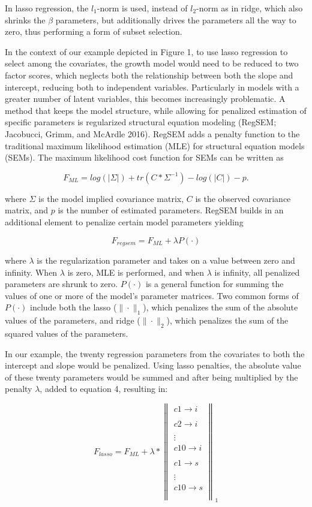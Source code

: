 In lasso regression, the \(l_{1}\)-norm is used, instead of
\(l_{2}\)-norm as in ridge, which also shrinks the \(\beta\) parameters,
but additionally drives the parameters all the way to zero, thus
performing a form of subset selection.

In the context of our example depicted in Figure 1, to use lasso
regression to select among the covariates, the growth model would need
to be reduced to two factor scores, which neglects both the relationship
between both the slope and intercept, reducing both to independent
variables. Particularly in models with a greater number of latent
variables, this becomes increasingly problematic. A method that keeps
the model structure, while allowing for penalized estimation of specific
parameters is regularized structural equation modeling (RegSEM;
Jacobucci, Grimm, and McArdle 2016). RegSEM adds a penalty function to
the traditional maximum likelihood estimation (MLE) for structural
equation models (SEMs). The maximum likelihood cost function for SEMs
can be written as

\[\tag{3}
F_{ML}=log(\left|\Sigma\right|)+tr(C*\Sigma^{-1})-log(\left|C\right|)- p.
\]

where \(\Sigma\) is the model implied covariance matrix, \(C\) is the
observed covariance matrix, and \(p\) is the number of estimated
parameters. RegSEM builds in an additional element to penalize certain
model parameters yielding

\[\tag{4}
F_{regsem} = F_{ML} + \lambda P(\cdot)
\]

where \(\lambda\) is the regularization parameter and takes on a value
between zero and infinity. When \(\lambda\) is zero, MLE is performed,
and when \(\lambda\) is infinity, all penalized parameters are shrunk to
zero. \(P(\cdot)\) is a general function for summing the values of one
or more of the model's parameter matrices. Two common forms of
\(P(\cdot)\) include both the lasso (\(\| \cdot \|_{1}\)), which
penalizes the sum of the absolute values of the parameters, and ridge
(\(\| \cdot \|_{2}\)), which penalizes the sum of the squared values of
the parameters.

In our example, the twenty regression parameters from the covariates to
both the intercept and slope would be penalized. Using lasso penalties,
the absolute value of these twenty parameters would be summed and after
being multiplied by the penalty \(\lambda\), added to equation 4,
resulting in:

\[\tag{5}
F_{lasso} = F_{ML} + \lambda * \left\|  \begin{matrix}  
c1 \xrightarrow[]{} i\\
c2\xrightarrow[]{}i\\
\vdots \\
c10\xrightarrow[]{}i\\
c1\xrightarrow[]{}s\\
\vdots \\
c10\xrightarrow[]{}s\\
\end{matrix}  \right\|_{1}
\]

